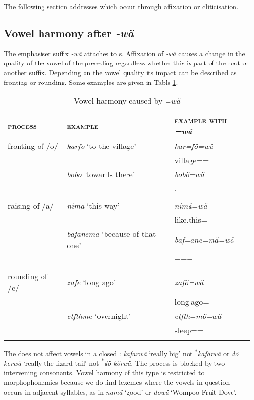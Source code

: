 The following section addresses  which occur through affixation or cliticisation.

\subsection{Vowel harmony after \emph{-wä}} \label{vowharmwae}

The emphasiser suffix \emph{-wä} attaches to s. Affixation of \emph{-wä} causes a change in the quality of the vowel of the preceding  regardless whether this  is part of the root or another suffix. Depending on the vowel quality its impact can be described as fronting or rounding. Some examples are given in Table \ref{vowelharmwae}.

\begin{table}
\caption{Vowel harmony caused by \emph{=wä}}
\label{vowelharmwae}
	\begin{tabular}{lll}
		\lsptoprule
		\textsc{process}&\textsc{example}& \textsc{example with} \emph{=wä} \\ \midrule
		fronting of /o/&\emph{karfo} `to the village' & \emph{kar=fö=wä} \\
		&&village=\Abl{}=\Emph{}\\
		&\emph{bobo} `towards there' & \emph{bobö=wä}\\
		&&\Med{}.\All{}=\Emph{}\\
		&&\\
		raising of /a/&\emph{nima} `this way' & \emph{nimä=wä}\\
		&&like.this=\Emph{}\\
		&\emph{bafanema} `because of that one' & \emph{baf=ane=mä=wä}\\
		&&\Recog=\Poss=\Char=\Emph{}\\
		&&\\
		rounding of /e/&\emph{zafe} `long ago' & \emph{zafö=wä}\\
		&&long.ago=\Emph\\
		&\emph{etfthme} `overnight' & \emph{etfth=mö=wä}\\
		&&sleep=\Ins=\Emph\\
		\lspbottomrule
	\end{tabular}
\end{table}	%

The  does not affect vowels in a closed : \emph{kafarwä} `really big' not \textsuperscript{$\ast$}\emph{kafärwä} or \emph{dö kerwä} `really the lizard tail' not \textsuperscript{$\ast$}\emph{dö körwä}. The process is blocked by two intervening consonants. Vowel harmony of this type is restricted to morphophonemics because we do find lexemes where the vowels in question occurs in adjacent syllables, as in \emph{namä} `good' or \emph{dowä} `Wompoo Fruit Dove'.

